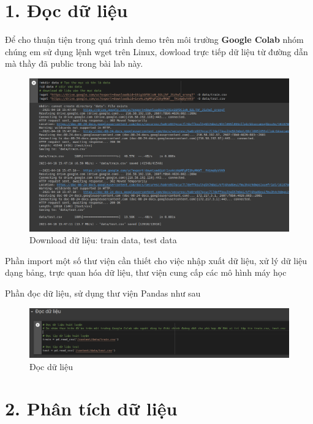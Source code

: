 \documentclass{article}
\begin{document}
	\section{1. Đọc dữ liệu}
	\qquad Để cho thuận tiện trong quá trình demo trên môi trường \textbf{Google Colab} nhóm chúng em sử dụng lệnh wget trên Linux, dowload trực tiếp dữ liệu từ đường dẫn mà thầy đã public trong bài lab này.
	\begin{figure}[H]
		\centering
		\includegraphics[width=1\textwidth]{images/download_data.png}
		\caption{Download dữ liệu: train data, test data}
		\label{fig:writing-thesis}
	\end{figure}
	
	Phần import một số thư viện cần thiết cho việc nhập xuất dữ liệu, xử lý dữ liệu dạng bảng, trực quan hóa dữ liệu, thư viện cung cấp các mô hình máy học
	
	Phần đọc dữ liệu, sử dụng thư viện Pandas như sau
	\begin{figure}[H]
		\centering
		\includegraphics[width=1\textwidth]{images/read_train_test.png}
		\caption{Đọc dữ liệu}
		\label{fig:writing-thesis}
	\end{figure}
	
	\section{2. Phân tích dữ liệu}
	
\end{document}
